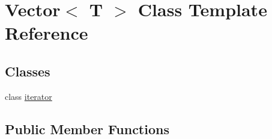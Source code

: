 \hypertarget{class_vector}{}\section{Vector$<$ T $>$ Class Template Reference}
\label{class_vector}
\subsection*{Classes}
\begin{DoxyCompactItemize}
\item 
class \mbox{\hyperlink{class_vector_1_1iterator}{iterator}}
\end{DoxyCompactItemize}
\subsection*{Public Member Functions}
